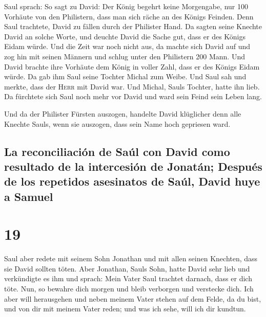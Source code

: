  Saul sprach: So sagt zu David: Der König begehrt keine
Morgengabe, nur 100 Vorhäute von den Philistern, dass man sich räche an
des Königs Feinden. Denn Saul trachtete, David zu fällen durch der
Philister Hand.  Da sagten seine Knechte David an solche
Worte, und deuchte David die Sache gut, dass er des Königs Eidam würde.
Und die Zeit war noch nicht aus,  da machte sich David
auf und zog hin mit seinen Männern und schlug unter den Philistern 200
Mann. Und David brachte ihre Vorhäute dem König in voller Zahl, dass er
des Königs Eidam würde. Da gab ihm Saul seine Tochter Michal zum Weibe.
 Und Saul sah und merkte, dass der \textsc{Herr} mit
David war. Und Michal, Sauls Tochter, hatte ihn lieb.  Da
fürchtete sich Saul noch mehr vor David und ward sein Feind sein Leben
lang.

 Und da der Philister Fürsten auszogen, handelte David
klüglicher denn alle Knechte Sauls, wenn sie auszogen, dass sein Name
hoch gepriesen ward.

\hypertarget{la-reconciliaciuxf3n-de-sauxfal-con-david-como-resultado-de-la-intercesiuxf3n-de-jonatuxe1n-despuuxe9s-de-los-repetidos-asesinatos-de-sauxfal-david-huye-a-samuel}{%
\subsection{La reconciliación de Saúl con David como resultado de la
intercesión de Jonatán; Después de los repetidos asesinatos de Saúl,
David huye a
Samuel}\label{la-reconciliaciuxf3n-de-sauxfal-con-david-como-resultado-de-la-intercesiuxf3n-de-jonatuxe1n-despuuxe9s-de-los-repetidos-asesinatos-de-sauxfal-david-huye-a-samuel}}

\hypertarget{section-18}{%
\section{19}\label{section-18}}

 Saul aber redete mit seinem Sohn Jonathan und mit allen
seinen Knechten, dass sie David sollten töten. Aber Jonathan, Sauls
Sohn, hatte David sehr lieb  und verkündigte es ihm und
sprach: Mein Vater Saul trachtet darnach, dass er dich töte. Nun, so
bewahre dich morgen und bleib verborgen und verstecke dich.
 Ich aber will herausgehen und neben meinem Vater stehen
auf dem Felde, da du bist, und von dir mit meinem Vater reden; und was
ich sehe, will ich dir kundtun.

